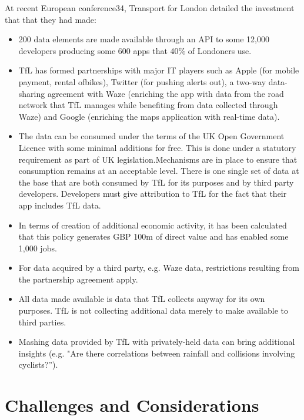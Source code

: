At recent European conference34, Transport for London detailed the investment that
that they had made:
\begin{itemize}
	\item 200 data elements are made available through an API to some 12,000
	developers producing some 600 apps that 40\% of Londoners use.
	\item TfL has formed partnerships with major IT players such as Apple
	(for mobile payment, rental ofbikes), Twitter (for pushing alerts out),
	a two-way data-sharing agreement with Waze (enriching the app with data
	from the road network that TfL manages while benefiting from data collected
	through Waze) and Google (enriching the maps application with real-time data).
	\item The data can be consumed under the terms of the UK Open Government
	Licence with some minimal additions for free. This is done under a statutory
	requirement as part of UK legislation.Mechanisms are in place to ensure that
	consumption remains at an acceptable level. There is one single set of data
	at the base that are both consumed by TfL for its purposes and by third	party
	developers. Developers must give attribution to TfL for the fact that their
	app includes TfL data.
	\item In terms of creation of additional economic activity, it has been
	calculated that this policy	generates GBP 100m of direct value and has enabled
	some 1,000 jobs.
	\item For data acquired by a third party, e.g. Waze data, restrictions resulting
	from the partnership agreement apply.
	\item All data made available is data that TfL collects anyway for its own
	purposes. TfL is not collecting additional data merely to make available to
	third parties.
	\item Mashing data provided by TfL with privately-held data can bring additional
	insights (e.g. "Are	there correlations between rainfall and collisions involving cyclists?”).
\end{itemize}

\section{Challenges and Considerations}

